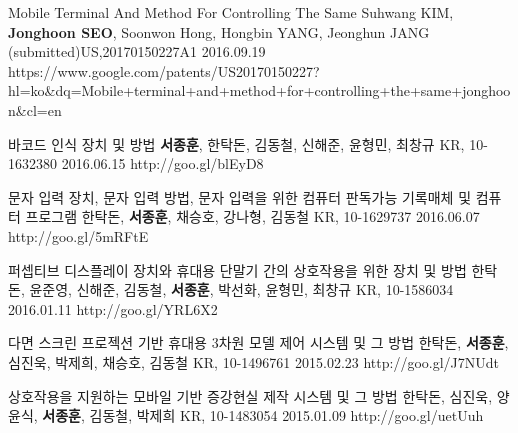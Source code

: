 \begin{cventries}
  \cvpatententry
    {Mobile Terminal And Method For Controlling The Same}
    {Suhwang KIM, \textbf{Jonghoon SEO}, Soonwon Hong, Hongbin YANG, Jeonghun JANG}
    {(submitted)US,20170150227A1}
    {2016.09.19}
    {https://www.google.com/patents/US20170150227?hl=ko&dq=Mobile+terminal+and+method+for+controlling+the+same+jonghoon&cl=en}

  \cvpatententry
    {바코드 인식 장치 및 방법} %
    {\textbf{서종훈}, 한탁돈, 김동철, 신해준, 윤형민, 최창규} %
    {KR, 10-1632380} %
    {2016.06.15} %
    {http://goo.gl/blEyD8}

  \cvpatententry
    {문자 입력 장치, 문자 입력 방법, 문자 입력을 위한 컴퓨터 판독가능 기록매체 및 컴퓨터 프로그램} %
    {한탁돈, \textbf{서종훈}, 채승호, 강나형, 김동철} %
    {KR, 10-1629737} %
    {2016.06.07} %
    {http://goo.gl/5mRFtE}

  \cvpatententry
    {퍼셉티브 디스플레이 장치와 휴대용 단말기 간의 상호작용을 위한 장치 및 방법} %
    {한탁돈, 윤준영, 신해준, 김동철, \textbf{서종훈}, 박선화, 윤형민, 최창규} %
    {KR, 10-1586034} %
    {2016.01.11} %
    {http://goo.gl/YRL6X2}

  \cvpatententry
    {다면 스크린 프로젝션 기반 휴대용 3차원 모델 제어 시스템 및 그 방법} %
    {한탁돈, \textbf{서종훈}, 심진욱, 박제희, 채승호, 김동철} %
    {KR, 10-1496761} %
    {2015.02.23} %
    {http://goo.gl/J7NUdt}

  \cvpatententry
    {상호작용을 지원하는 모바일 기반 증강현실 제작 시스템 및 그 방법} %
    {한탁돈, 심진욱, 양윤식, \textbf{서종훈}, 김동철, 박제희} %
    {KR, 10-1483054} %
    {2015.01.09} %
    {http://goo.gl/uetUuh}


\end{cventries}
